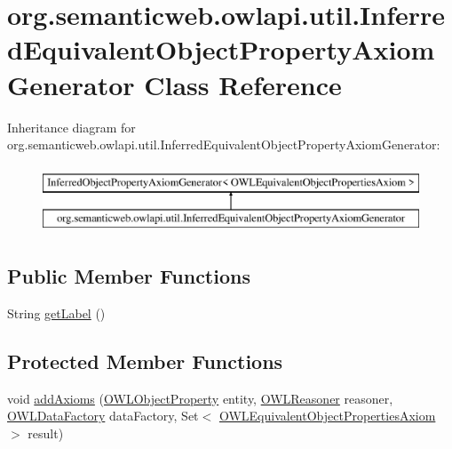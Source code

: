 \hypertarget{classorg_1_1semanticweb_1_1owlapi_1_1util_1_1_inferred_equivalent_object_property_axiom_generator}{\section{org.\-semanticweb.\-owlapi.\-util.\-Inferred\-Equivalent\-Object\-Property\-Axiom\-Generator Class Reference}
\label{classorg_1_1semanticweb_1_1owlapi_1_1util_1_1_inferred_equivalent_object_property_axiom_generator}
}
Inheritance diagram for org.\-semanticweb.\-owlapi.\-util.\-Inferred\-Equivalent\-Object\-Property\-Axiom\-Generator\-:\begin{figure}[H]
\begin{center}
\leavevmode
\includegraphics[height=2.000000cm]{classorg_1_1semanticweb_1_1owlapi_1_1util_1_1_inferred_equivalent_object_property_axiom_generator}
\end{center}
\end{figure}
\subsection*{Public Member Functions}
\begin{DoxyCompactItemize}
\item 
String \hyperlink{classorg_1_1semanticweb_1_1owlapi_1_1util_1_1_inferred_equivalent_object_property_axiom_generator_ac20dfcda2d6bfcc4b4c56bad652bd43b}{get\-Label} ()
\end{DoxyCompactItemize}
\subsection*{Protected Member Functions}
\begin{DoxyCompactItemize}
\item 
void \hyperlink{classorg_1_1semanticweb_1_1owlapi_1_1util_1_1_inferred_equivalent_object_property_axiom_generator_a27ec96c1b419c962bffb95c8b8d35aa3}{add\-Axioms} (\hyperlink{interfaceorg_1_1semanticweb_1_1owlapi_1_1model_1_1_o_w_l_object_property}{O\-W\-L\-Object\-Property} entity, \hyperlink{interfaceorg_1_1semanticweb_1_1owlapi_1_1reasoner_1_1_o_w_l_reasoner}{O\-W\-L\-Reasoner} reasoner, \hyperlink{interfaceorg_1_1semanticweb_1_1owlapi_1_1model_1_1_o_w_l_data_factory}{O\-W\-L\-Data\-Factory} data\-Factory, Set$<$ \hyperlink{interfaceorg_1_1semanticweb_1_1owlapi_1_1model_1_1_o_w_l_equivalent_object_properties_axiom}{O\-W\-L\-Equivalent\-Object\-Properties\-Axiom} $>$ result)
\end{DoxyCompactItemize}


